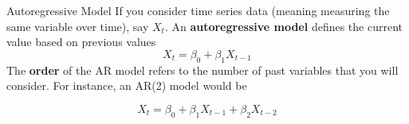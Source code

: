 \documentclass{beamer}
\begin{document}
\begin{frame}{Autoregressive Model}
If you consider time series data (meaning measuring the same variable over time), say $X_t$. An \textbf{autoregressive model} defines the current value based on previous values
\begin{equation*}
	X_t= \beta_0 + \beta_1 X_{t-1}
\end{equation*}	
The \textbf{order} of the AR model refers to the number of past variables that you will consider. For instance, an AR(2) model would be 

\begin{equation*}
X_t= \beta_0 + \beta_1 X_{t-1}+ \beta_2 X_{t-2}
\end{equation*}

\end{frame}
	
	
\end{document}
